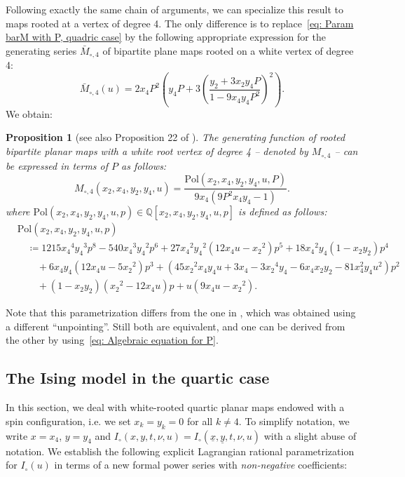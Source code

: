 \documentclass[11pt,reqno,tbtags]{amsart}
\newcommand{\ux}{\underline{x}}
\newcommand{\uy}{\underline{y}}
\newtheorem{prop}[theo]{Proposition}
\numberwithin{equation}{section}
\numberwithin{theo}{section}
\theoremstyle{definition}
\begin{document}
Following exactly the same chain of arguments, we can specialize this result to maps rooted at a vertex of degree 4. The only difference is to replace~\eqref{eq: Param barM with P, quadric case} by the following appropriate expression for the generating series $\bar{M}_{\circ,4}$ of bipartite plane maps rooted on a white vertex of degree 4:
\begin{equation}\label{eq: Param barM with P, quadric case, root degree 4}
	\bar{M}_{\circ,4}(u) =  2x_4P^2\left(y_4P + 3\left(\frac{y_2 + 3x_2y_4P }{1-9x_4y_4P^2}\right)^2\right).
\end{equation}
We obtain:
\begin{prop}[see also Proposition 22 of \cite{BousquetMelouSchaeffer_Bipartite}]\label{prop: Algebraic parametrization for M4(u)}
The generating function of rooted bipartite planar maps with a white root vertex of degree 4 -- denoted by  $M_{\circ,4}$ -- can be expressed in terms of $P$ as follows:
\begin{equation}
	M_{\circ,4}(x_2,x_4,y_2,y_4,u) = \frac{\mathrm{Pol}(x_2,x_4,y_2,y_4,u,P)}{9 x_{4} \left(9 P^{2} x_{4} y_{4}-1\right)}.
\end{equation}
where $\mathrm{Pol}(x_2,x_4,y_2,y_4,u,p)\in\mathbb{Q}\left[x_2,x_4,y_2,y_4,u,p\right]$ is defined as follows: 
\begin{align*}
&\mathrm{Pol}(x_2,x_4,y_2,y_4,u,p) \\
&\quad\coloneqq  1215 {x_{4}}^{4} {y_{4}}^{3}  p^{8}		-540  {x_{4}}^{3} {y_{4}}^{2} p^{6} 	+27 {x_{4}}^{2} {y_{4}}^{2} \left(12 x_{4}u-{x_{2}}^{2}\right) p^{5}		+18 {x_{4}}^{2} y_{4} \left(1-x_{2} y_{2}\right) p^{4}\\
&\qquad	 +6 x_{4} y_{4} \left(12 x_{4}u-5 {x_{2}}^{2}\right) p^{3} 	+\left(45 {x_{2}}^{2} x_{4} y_{4}u +3 x_{4} -3 {x_{2}}^{4} y_{4}-6 x_{4} x_{2} y_{2}-81 x_{4}^{2} y_{4}u^2\right) p^{2}	\\
&\qquad	+\left(1-x_{2} y_{2}\right) \left({x_{2}}^{2}-12 x_{4}u\right) p+ u\left(9 x_{4}u-{x_{2}}^{2}\right).
\end{align*}
\end{prop}
Note that this parametrization differs from the one in \cite{BousquetMelouSchaeffer_Bipartite}, which was obtained using a different ``unpointing''. Still both  are equivalent, and one can be derived from the other by using~\eqref{eq: Algebraic equation for P}.


	\subsection{The Ising model in the quartic case}\label{sec: Lagragian Ising Quartic}
In this section, we deal with white-rooted quartic planar maps endowed with a spin configuration, i.e. we set $x_k=y_k=0$ for all $k\neq 4$. To simplify notation, we write $x=x_4$, $y=y_4$ and $I_\circ(x,y,t,\nu,u)=I_\circ(\ux,\uy,t,\nu,u)$ with a slight abuse of notation. 
We establish the following explicit Lagrangian rational parametrization for $I_\circ(u)$ in terms of a new formal power series with \emph{non-negative} coefficients:
\end{document}
